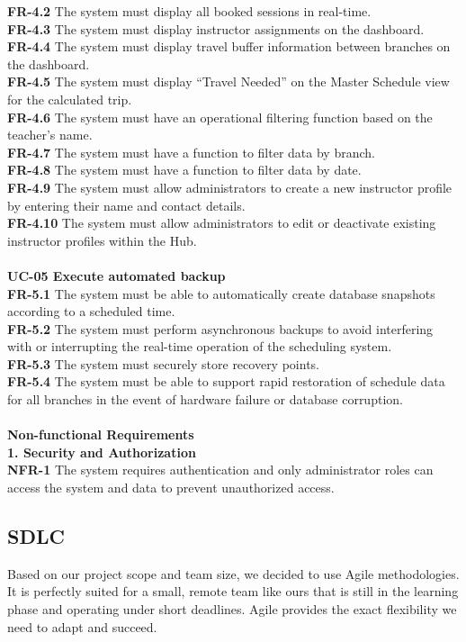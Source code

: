 \textbf{FR-4.2} The system must display all booked sessions in real-time. \\
\textbf{FR-4.3} The system must display instructor assignments on the dashboard. \\
\textbf{FR-4.4} The system must display travel buffer information between branches on the dashboard. \\
\textbf{FR-4.5} The system must display \enquote{Travel Needed} on the Master Schedule view for the calculated trip. \\
\textbf{FR-4.6} The system must have an operational filtering function based on the teacher's name. \\
\textbf{FR-4.7} The system must have a function to filter data by branch. \\
\textbf{FR-4.8} The system must have a function to filter data by date. \\
\textbf{FR-4.9} The system must allow administrators to create a new instructor profile by entering their name and contact details. \\
\textbf{FR-4.10} The system must allow administrators to edit or deactivate existing instructor profiles within the Hub. \\
\\
\textbf{UC-05 Execute automated backup} \\
\textbf{FR-5.1} The system must be able to automatically create database snapshots according to a scheduled time. \\
\textbf{FR-5.2} The system must perform asynchronous backups to avoid interfering with or interrupting the real-time operation of the scheduling system. \\
\textbf{FR-5.3} The system must securely store recovery points. \\
\textbf{FR-5.4} The system must be able to support rapid restoration of schedule data for all branches in the event of hardware failure or database corruption. \\
\\
\textbf{Non-functional Requirements}\\
\textbf{1. Security and Authorization} \\
\textbf{NFR-1} The system requires authentication and only administrator roles can access the system and data to prevent unauthorized access.
\subsection{SDLC}
Based on our project scope and team size, we decided to use Agile methodologies. It is perfectly suited for a small, remote team like ours that is still in the learning phase and operating under short deadlines. Agile provides the exact flexibility we need to adapt and succeed.

